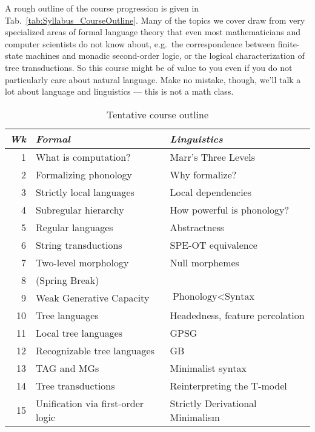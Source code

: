 A rough outline of the course progression is given in Tab.~\vref{tab:Syllabus_CourseOutline}.
Many of the topics we cover draw from very specialized areas of formal language theory that even most mathematicians and computer scientists do not know about, e.g.\ the correspondence between finite-state machines and monadic second-order logic, or the logical characterization of tree transductions.
So this course might be of value to you even if you do not particularly care about natural language.
Make no mistake, though, we'll talk a lot about language and linguistics --- this is not a math class.

\begin{table}
    \centering
    \begin{tabular}{rp{5.5cm}p{5.5cm}}
        \toprule
        \emph{Wk} & \emph{Formal} & \emph{Linguistics} \\
        \toprule
        1         & What is computation? & Marr's Three Levels\\
        2         & Formalizing phonology & Why formalize?\\
        3         & Strictly local languages & Local dependencies\\
        4         & Subregular hierarchy & How powerful is phonology?\\
        5         & Regular languages & Abstractness\\
        6         & String transductions & SPE-OT equivalence\\
        7         & Two-level morphology & Null morphemes\\
        \midrule
        8         & (Spring Break) & \\
        \midrule
        9         &  Weak Generative Capacity & $\text{Phonology} < \text{Syntax}$\\
        10        &  Tree languages & Headedness, feature percolation\\
        11        &  Local tree languages & GPSG\\
        12        &  Recognizable tree languages & GB\\
        13        &  TAG and MGs & Minimalist syntax\\
        14        &  Tree transductions & Reinterpreting the T-model\\
        15        &  Unification via first-order logic & Strictly Derivational Minimalism\\
        \bottomrule
    \end{tabular}
\caption{Tentative course outline}
\label{tab:Syllabus_CourseOutline}
\end{table}


